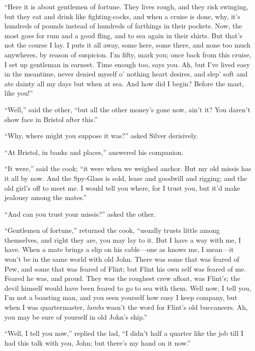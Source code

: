 \enquote{Here it is about gentlemen of fortune. They lives rough, and they risk swinging, but they eat and drink like fighting-cocks, and when a cruise is done, why, it’s hundreds of pounds instead of hundreds of farthings in their pockets. Now, the most goes for rum and a good fling, and to sea again in their shirts. But that’s not the course I lay. I puts it all away, some here, some there, and none too much anywheres, by reason of suspicion. I’m fifty, mark you; once back from this cruise, I set up gentleman in earnest. Time enough too, says you. Ah, but I’ve lived easy in the meantime, never denied myself o’ nothing heart desires, and slep’ soft and ate dainty all my days but when at sea. And how did I begin? Before the mast, like you!}

\enquote{Well,} said the other, \enquote{but all the other money’s gone now, ain’t it? You daren’t show face in Bristol after this.}

\enquote{Why, where might you suppose it was?} asked Silver derisively.

\enquote{At Bristol, in banks and places,} answered his companion.

\enquote{It were,} said the cook; \enquote{it were when we weighed anchor. But my old missis has it all by now. And the Spy-Glass is sold, lease and goodwill and rigging; and the old girl’s off to meet me. I would tell you where, for I trust you, but it’d make jealousy among the mates.}

\enquote{And can you trust your missis?} asked the other.

\enquote{Gentlemen of fortune,} returned the cook, \enquote{usually trusts little among themselves, and right they are, you may lay to it. But I have a way with me, I have. When a mate brings a slip on his cable---one as knows me, I mean---it won’t be in the same world with old John. There was some that was feared of Pew, and some that was feared of Flint; but Flint his own self was feared of me. Feared he was, and proud. They was the roughest crew afloat, was Flint’s; the devil himself would have been feared to go to sea with them. Well now, I tell you, I’m not a boasting man, and you seen yourself how easy I keep company, but when I was quartermaster, \textit{lambs} wasn’t the word for Flint’s old buccaneers. Ah, you may be sure of yourself in old John’s ship.}

\enquote{Well, I tell you now,} replied the lad, \enquote{I didn’t half a quarter like the job till I had this talk with you, John; but there’s my hand on it now.}

